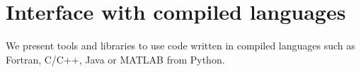 \section{Interface with compiled languages}

We present tools and libraries to use code written in compiled languages such as Fortran, C/C++, Java or MATLAB from Python.
